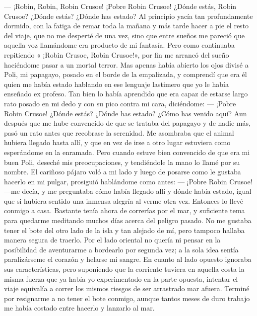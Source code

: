 \documentclass{novela}
\begin{document}
    — ¡Robin, Robin, Robin Crusoe! ¡Pobre Robin Crusoe! ¿Dónde estás, Robin Crusoe? ¿Dónde estás? ¿Dónde has estado?
    Al principio yacía tan profundamente dormido, con la fatiga de remar toda la mañana y más tarde hacer a pie el resto del viaje, que no me desperté de una vez, sino que entre sueños me pareció que aquella voz llamándome era producto de mi fantasía. Pero como continuaba repitiendo « ¡Robin Crusoe, Robin Crusoe!», por fin me arrancó del sueño haciéndome pasar a un mortal terror. Mas apenas había abierto los ojos divisé a Poli, mi papagayo, posado en el borde de la empalizada, y comprendí que era él quien me había estado hablando en ese lenguaje lastimero que yo le había enseñado ex profeso. Tan bien lo había aprendido que era capaz de estarse largo rato posado en mi dedo y con su pico contra mi cara, diciéndome:
    — ¡Pobre Robin Crusoe! ¿Dónde estás? ¿Dónde has estado? ¿Cómo has venido aquí?
    Aun después que me hube convencido de que se trataba del papagayo y de nadie más, pasó un rato antes que recobrase la serenidad. Me asombraba que el animal hubiera llegado hasta allí, y que en vez de irse a otro lugar estuviera como esperándome en la enramada. Pero cuando estuve bien convencido de que era mi buen Poli, deseché mis preocupaciones, y tendiéndole la mano lo llamé por su nombre. El cariñoso pájaro voló a mi lado y luego de posarse como le gustaba hacerlo en mi pulgar, prosiguió hablándome como antes:
    — ¡Pobre Robin Crusoe! —me decía, y me preguntaba cómo había llegado allí y dónde había estado, igual que si hubiera sentido una inmensa alegría al verme otra vez. Entonces lo llevé conmigo a casa.
    Bastante tenía ahora de correrías por el mar, y suficiente tema para quedarme meditando muchos días acerca del peligro pasado. No me gustaba tener el bote del otro lado de la isla y tan alejado de mí, pero tampoco hallaba manera segura de traerlo. Por el lado oriental no quería ni pensar en la posibilidad de aventurarme a bordearlo por segunda vez; a la sola idea sentía paralizárseme el corazón y helarse mi sangre. En cuanto al lado opuesto ignoraba sus características, pero suponiendo que la corriente tuviera en aquella costa la misma fuerza que ya había yo experimentado en la parte opuesta, intentar el viaje equivalía a correr los mismos riesgos de ser arrastrado mar afuera. Terminé por resignarme a no tener el bote conmigo, aunque tantos meses de duro trabajo me había costado entre hacerlo y lanzarlo al mar.
\end{document}

